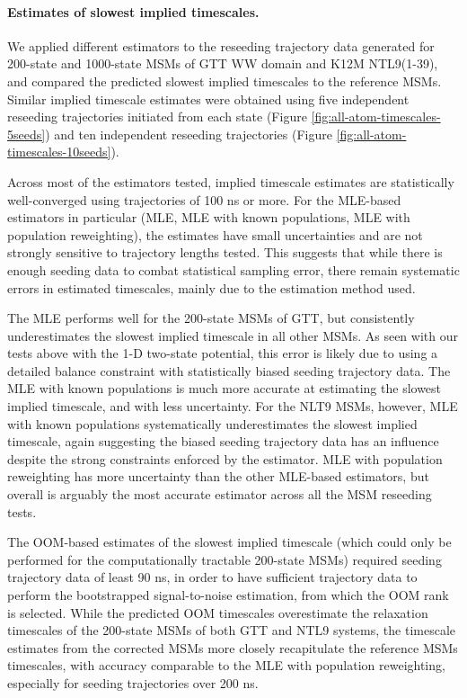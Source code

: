 \documentclass[%
 aip,
rsi,%
 amsmath,amssymb,
 reprint,%
]{revtex4-1}
\begin{document}
\paragraph{Estimates of slowest implied timescales.}

We applied different estimators to the reseeding trajectory data generated for 200-state and 1000-state MSMs of GTT WW domain and K12M NTL9(1-39), and compared the predicted slowest implied timescales to the reference MSMs. Similar implied timescale estimates were obtained using five independent reseeding trajectories initiated from each state (Figure \ref{fig:all-atom-timescales-5seeds}) and ten independent reseeding trajectories (Figure \ref{fig:all-atom-timescales-10seeds}).

Across most of the estimators tested, implied timescale estimates are statistically well-converged using trajectories of 100 ns or more.  For the MLE-based estimators in particular (MLE, MLE with known populations, MLE with population reweighting), the estimates have small uncertainties and are not strongly sensitive to trajectory lengths tested. This suggests that while there is enough seeding data to combat statistical sampling error, there remain systematic errors in estimated timescales, mainly due to the estimation method used.

The MLE performs well for the 200-state MSMs of GTT, but consistently underestimates the slowest implied timescale in all other MSMs.  As seen with our tests above with the 1-D two-state potential, this error is likely due to using a detailed balance constraint with statistically biased seeding trajectory data. The MLE with known populations is much more accurate at estimating the slowest implied timescale, and with less uncertainty. For the NLT9 MSMs, however, MLE with known populations systematically underestimates the slowest implied timescale, again suggesting the biased seeding trajectory data has an influence despite the strong constraints enforced by the estimator. MLE with population reweighting has more uncertainty than the other MLE-based estimators, but overall is arguably the most accurate estimator across all the MSM reseeding tests.

The OOM-based estimates of the slowest implied timescale (which could only be performed for the computationally tractable 200-state MSMs) required seeding trajectory data of least 90 ns, in order to have sufficient trajectory data to perform the bootstrapped signal-to-noise estimation, from which the OOM rank is selected.  While the predicted OOM timescales overestimate the relaxation timescales of the 200-state MSMs of both GTT and NTL9 systems, the timescale estimates from the corrected MSMs more closely recapitulate the reference MSMs timescales, with accuracy comparable to the MLE with population reweighting, especially for seeding trajectories over 200 ns.
\end{document}

